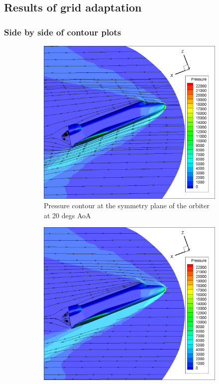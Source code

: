 \subsection{Results of grid adaptation}

\subsubsection{Side by side of contour plots}
\begin{figure}[H]

	\centering
    \begin{subfigure}[b]{0.65\textwidth}
         \centering
		 \includegraphics[width=\textwidth]{report_images/20_sym_pressure_contour.png}
		 \caption{Pressure contour at the symmetry plane of the orbiter at 20 degs AoA}
		 \label{fig: 20_sym_pressure_contour}
    \end{subfigure} 
    \begin{subfigure}[b]{0.65\textwidth}
         \centering
		 \includegraphics[width=\textwidth]{report_images/20_adapted_sym_pressure_contour.png}

\end{subfigure}
\end{figure}
